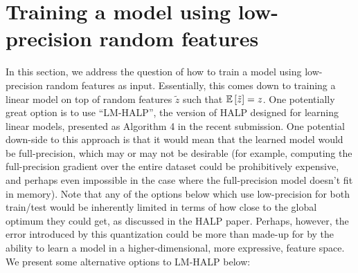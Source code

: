 \documentclass[12pt]{article}
\newcommand{\tz}{\tilde{z}}
\begin{document}
\section{Training a model using low-precision random features}
In this section, we address the question of how to train a model using low-precision random features as input.  Essentially, this comes down to training a linear model on top of random features $\tz$ such that $\expect{}{\tz} = z$.  One potentially
great option is to use ``LM-HALP'', the version of HALP designed for learning linear models, presented as Algorithm 4 in the
recent submission.  One potential down-side to this approach is that it would mean that the learned model would be
full-precision, which may or may not be desirable (for example, computing the full-precision gradient over the entire dataset
could be prohibitively expensive, and perhaps even impossible in the case where the full-precision model doesn't fit in
memory).  Note that any of the options below which use low-precision for both train/test would be inherently limited in terms of
how close to the global optimum they could get, as discussed in the HALP paper.  Perhaps, however, the error introduced by this
quantization could be more than made-up for by the ability to learn a model in a higher-dimensional, more expressive, feature
space.  We present some alternative options to LM-HALP below:
\end{document}
